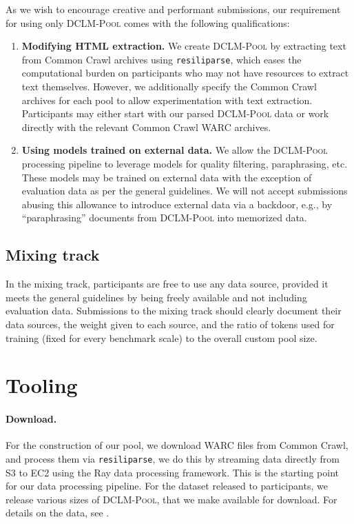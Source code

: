 \documentclass{article}
\newcommand{\rawpool}{\textsc{DCLM-Pool}\xspace}
\newcommand{\resiliparse}{\texttt{resiliparse}\xspace}
\newcommand{\commoncrawl}{Common Crawl\xspace}
\begin{document}
As we wish to encourage creative and performant submissions, our requirement for using only \rawpool comes with the following qualifications:
\begin{enumerate}
    \item \textbf{Modifying HTML extraction.}
    We create \rawpool by extracting text from \commoncrawl archives using \resiliparse, which eases the computational burden on participants who may not have resources to extract text themselves.
    However, we additionally specify the \commoncrawl archives for each pool to allow experimentation with text extraction. Participants may either start with our parsed \rawpool data or work directly with the relevant \commoncrawl WARC archives.
    \item \textbf{Using models trained on external data.} We allow the \rawpool processing pipeline to leverage models for quality filtering, paraphrasing, etc. These models may be trained on external data with the exception of evaluation data as per the general guidelines.
    We will not accept submissions abusing this allowance to introduce external data via a backdoor, e.g., by ``paraphrasing'' documents from \rawpool into memorized data.
\end{enumerate}


\subsection{Mixing track}
In the mixing track, participants are free to use any data source, provided it meets the general guidelines by being freely available and not including evaluation data. Submissions to the mixing track should clearly document their data sources, the weight given to each source, and the ratio of tokens used for training (fixed for every benchmark scale) to the overall custom pool size.


\section{Tooling}\label{appx:tooling}

\paragraph{Download.} For the construction of our pool, we download WARC files from \commoncrawl, and process them via \resiliparse, we do this by streaming data directly from S3 to EC2 using the Ray data processing framework.
This is the starting point for our data processing pipeline.
For the dataset released to participants, we release various sizes of \rawpool, that we make available for download. For details on the data, see .
\end{document}
